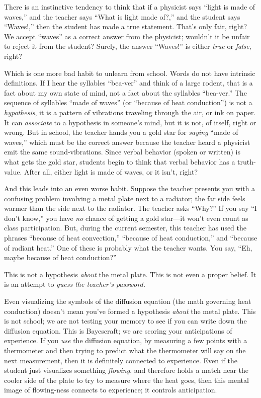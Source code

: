 {
 There is an instinctive tendency to think that if a physicist says
``light is made of waves,'' and the
teacher says ``What is light made
of?,'' and the student says
``Waves!,'' then the student has
made a true statement. That's only fair, right? We
accept ``waves'' as a correct answer
from the physicist; wouldn't it be unfair to reject it
from the student? Surely, the answer
``Waves!'' is either \textit{true}
or \textit{false}, right?}

{
 Which is one more bad habit to unlearn from school. Words do not
have intrinsic definitions. If I hear the syllables
``bea-ver'' and think of a large
rodent, that is a fact about my own state of mind, not a fact about the
syllables ``bea-ver.'' The sequence
of syllables ``made of waves'' (or
``because of heat conduction'') is
not a \textit{hypothesis}, it is a pattern of vibrations traveling
through the air, or ink on paper. It can \textit{associate} to a
hypothesis in someone's mind, but it is not, of itself,
right or wrong. But in school, the teacher hands you a gold star for
\textit{saying} ``made of waves,''
which must be the correct answer because the teacher heard a physicist
emit the same sound-vibrations. Since verbal behavior (spoken or
written) is what gets the gold star, students begin to think that
verbal behavior has a truth-value. After all, either light is made of
waves, or it isn't, right?}

{
 And this leads into an even worse habit. Suppose the teacher
presents you with a confusing problem involving a metal plate next to a
radiator; the far side feels warmer than the side next to the radiator.
The teacher asks ``Why?'' If you say
``I don't know,''
you have \textit{no} chance of getting a gold star---it
won't even count as class participation. But, during
the current semester, this teacher has used the phrases
``because of heat convection,''
``because of heat conduction,'' and
``because of radiant heat.'' One of
these is probably what the teacher wants. You say,
``Eh, maybe because of heat
conduction?''}

{
 This is not a hypothesis \textit{about} the metal plate. This is
not even a proper belief. It is an attempt to \textit{guess the
teacher's password.}}

{
 Even visualizing the symbols of the diffusion equation (the math
governing heat conduction) doesn't mean
you've formed a hypothesis \textit{about} the metal
plate. This is not school; we are not testing your memory to see if you
can write down the diffusion equation. This is Bayescraft; we are
scoring your anticipations of experience. If you \textit{use} the
diffusion equation, by measuring a few points with a thermometer and
then trying to predict what the thermometer will say on the next
measurement, then it is definitely connected to experience. Even if the
student just visualizes something \textit{flowing}, and therefore holds
a match near the cooler side of the plate to try to measure where the
heat goes, then this mental image of flowing-ness connects to
experience; it controls anticipation.}

